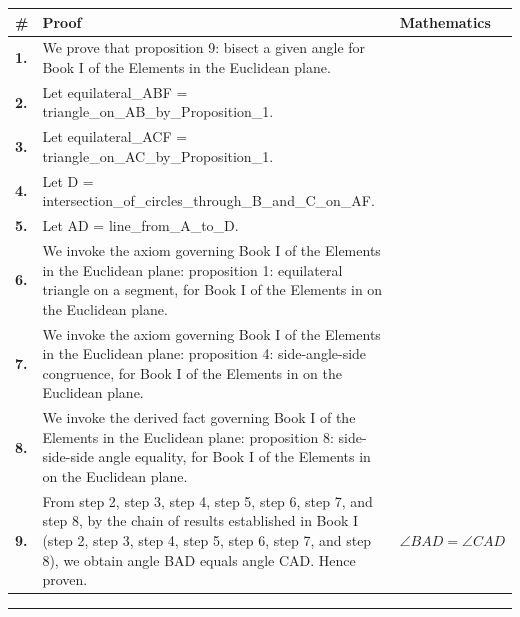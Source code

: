 \documentclass[11pt]{article}
\theoremstyle{definition}
\begin{document}
\begin{tabular}{@{} >{\raggedright\arraybackslash}p{} >{\raggedright\arraybackslash}p{} >{\raggedleft\arraybackslash}p{} @{}}
\textbf{\#} & \textbf{Proof} & \textbf{Mathematics} \\
\midrule
\textbf{1.} & We prove that proposition 9: bisect a given angle for Book I of the Elements in the Euclidean plane. & \\[0.45em]
\textbf{2.} & Let equilateral\_ABF = triangle\_on\_AB\_by\_Proposition\_1. & \\[0.45em]
\textbf{3.} & Let equilateral\_ACF = triangle\_on\_AC\_by\_Proposition\_1. & \\[0.45em]
\textbf{4.} & Let D = intersection\_of\_circles\_through\_B\_and\_C\_on\_AF. & \\[0.45em]
\textbf{5.} & Let AD = line\_from\_A\_to\_D. & \\[0.45em]
\textbf{6.} & We invoke the axiom governing Book I of the Elements in the Euclidean plane: proposition 1: equilateral triangle on a segment, for Book I of the Elements in on the Euclidean plane. & \\[0.45em]
\textbf{7.} & We invoke the axiom governing Book I of the Elements in the Euclidean plane: proposition 4: side-angle-side congruence, for Book I of the Elements in on the Euclidean plane. & \\[0.45em]
\textbf{8.} & We invoke the derived fact governing Book I of the Elements in the Euclidean plane: proposition 8: side-side-side angle equality, for Book I of the Elements in on the Euclidean plane. & \\[0.45em]
\textbf{9.} & From step 2, step 3, step 4, step 5, step 6, step 7, and step 8, by the chain of results established in Book I (step 2, step 3, step 4, step 5, step 6, step 7, and step 8), we obtain angle BAD equals angle CAD. Hence proven. & $\displaystyle \angle BAD = \angle CAD$ \\[0.45em]
\bottomrule
\end{tabular}
\label{thm:Geometry-Euclid Book I-proposition_9_bisect_a_given_angle}
\par\medskip\hrule
\end{document}
